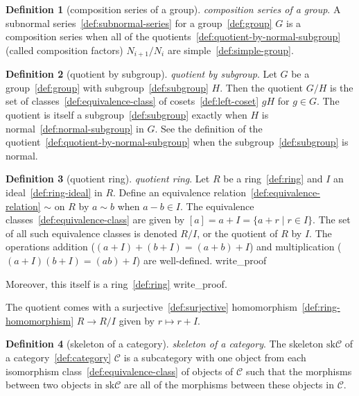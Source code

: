 \documentclass[12pt,a4paper]{article}
\theoremstyle{definition}
\newtheorem{definition}{Definition}
\begin{document}
\begin{definition}[composition series of a group]\label{def:composition-series-of-a-group}
\emph{composition series of a group}. A subnormal series~\ref{def:subnormal-series} for a group~\ref{def:group} $G$ is a composition series when all of the quotients~\ref{def:quotient-by-normal-subgroup} (called composition factors) $N_{i+1}/N_i$ are simple~\ref{def:simple-group}.
\end{definition}

\begin{definition}[quotient by subgroup]\label{def:quotient-by-subgroup}
\emph{quotient by subgroup}. Let $G$ be a group~\ref{def:group} with subgroup~\ref{def:subgroup} $H$. Then the quotient $G/H$ is the  set of classes~\ref{def:equivalence-class} of cosets~\ref{def:left-coset} $gH$ for $g\in G$. The quotient is itself a subgroup~\ref{def:subgroup} exactly when $H$ is normal~\ref{def:normal-subgroup} in $G$. See the definition of the quotient~\ref{def:quotient-by-normal-subgroup} when the subgroup~\ref{def:subgroup} is normal.
\end{definition}

\begin{definition}[quotient ring]\label{def:quotient-ring}
\emph{quotient ring}. Let $R$ be a ring~\ref{def:ring} and $I$ an ideal~\ref{def:ring-ideal} in $R$. Define an equivalence relation~\ref{def:equivalence-relation} $\sim$ on $R$ by $a\sim b$ when $a-b \in I$. The equivalence classes~\ref{def:equivalence-class} are given by $[a] = a+ I = \{a+r \mid r\in I\}$. The set of all such equivalence classes is denoted $R/I$, or the quotient of $R$ by $I$.  The operations addition ($(a+I)+ (b+I) = (a+b)+I$) and multiplication ($(a+I)(b+I) = (ab)+I$) are well-defined. write_proof 

Moreover, this itself is a ring~\ref{def:ring} write_proof.

The quotient comes with a surjective~\ref{def:surjective} homomorphism~\ref{def:ring-homomorphism} $R\to R/I$ given by $r\mapsto r+I$.
\end{definition}

\begin{definition}[skeleton of a category]\label{def:skeleton-of-a-category}
\emph{skeleton of a category}. The skeleton $\text{sk}\mathcal C$ of a category~\ref{def:category} $\mathcal C$ is a subcategory with one object from each isomorphism class~\ref{def:equivalence-class} of objects of $\mathcal C$ such that the morphisms between two objects in $\text{sk}\mathcal C$ are all of the morphisms between these objects in $\mathcal C$.
\end{definition}
\end{document}
